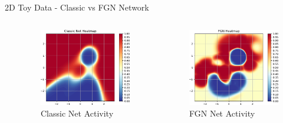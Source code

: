 \documentclass{beamer}
\begin{document}
\begin{frame}{2D Toy Data - Classic vs FGN Network}
\begin{columns}
\begin{column}{.333\textwidth}
    \end{column}
    \begin{column}{.333\textwidth}
    \begin{figure}
        \centering
        \includegraphics[width=1.\textwidth]{images/2D-network-toy/classic-heatmap.png}
        \caption*{Classic Net Activity}
    \end{figure}
    \end{column}
    \begin{column}{.333\textwidth}
    \begin{figure}
        \centering
        \includegraphics[width=1.\textwidth]{images/2D-network-toy/fgn-heatmap.png}
        \caption*{FGN Net Activity}
    \end{figure}
    \end{column}
    \end{columns}
    
\end{frame}
\end{document}
